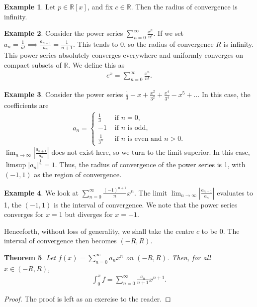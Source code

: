 \documentclass[15pt,a4paper]{book}
\newtheorem{theorem}{Theorem}[chapter]
\theoremstyle{definition}
\newtheorem{example}[theorem]{Example}
\newcommand{\abs}[1]{\left| #1 \right|} %
\newcommand{\R}{\mathbb{R}} %
\begin{document}
\begin{example}
    Let $p \in \R[x]$, and fix $c \in \R$. Then the radius of convergence is infinity.
\end{example}
\begin{example}
    Consider the power series $\sum_{n=0}^{\infty} \frac{x^{n}}{n!}$. If we set $a_{n} = \frac{1}{n!} \implies \frac{a_{n+1}}{a_{n}} = \frac{1}{n+1}$. This tends to 0, so the radius of convergence $R$ is infinity. This power series absolutely converges everywhere and uniformly converges on compact subsets of $\R$. We define this as
    \begin{align}
        e^{x} = \sum_{n=0}^{\infty} \frac{x^{n}}{n!}.
    \end{align}
\end{example}
\begin{example}
    Consider the power series $\frac{1}{3} - x + \frac{x^{2}}{3^{2}} + \frac{x^{4}}{3^{4}} - x^{5} + \ldots$ In this case, the coefficients are
    \begin{align}
        a_{n} = \begin{cases}
            \frac{1}{3} &\text{ if } n = 0,\\
            -1 &\text{ if $n$ is odd},\\
            \frac{1}{3^{n}} &\text{ if $n$ is even and } n > 0.
        \end{cases}
    \end{align}
    $\lim_{n \to \infty} \abs{\frac{a_{n+1}}{a_{n}}}$ does not exist here, so we turn to the limit superior. In this case, $\limsup \abs{a_{n}}^{\frac{1}{n}} = 1$. Thus, the radius of convergence of the power series is 1, with $(-1,1)$ as the region of convergence.
\end{example}
\begin{example}
    We look at $\sum_{n=0}^{\infty} \frac{(-1)^{n+1}}{n}x^{n}$. The limit $\lim_{n \to \infty} \abs{\frac{a_{n+1}}{a_{n}}}$ evaluates to 1, the $(-1,1)$ is the interval of convergence. We note that the power series converges for $x = 1$ but diverges for $x = -1$.
\end{example}
Henceforth, without loss of generality, we shall take the centre $c$ to be 0. The interval of convergence then becomes $(-R,R)$.

\begin{theorem}
    Let $f(x) = \sum_{n=0}^{\infty} a_{n}x^{n}$ on $(-R,R)$. Then, for all $x \in (-R,R)$,
    \begin{align*}
        \int_{0}^{x}f = \sum_{n=0}^{\infty} \frac{a_{n}}{n+1}x^{n+1}.
    \end{align*}
\end{theorem}
\begin{proof}
    The proof is left as an exercise to the reader.
\end{proof}
\end{document}
